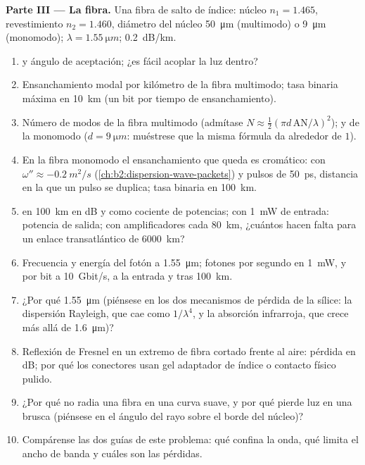\begin{problem}
\medskip
\noindent\textbf{Parte III --- La fibra.}
Una fibra de salto de índice: núcleo $n_1 = 1.465$, revestimiento $n_2 = 1.460$, diámetro
del núcleo \qty{50}{\micro m} (multimodo) o \qty{9}{\micro m} (monomodo);
$\lambda = \qty{1.55}{\micro m}$;  \qty{0.2}{dB/km}.
\begin{enumerate}[resume]
  \item {} y ángulo de aceptación; ¿es fácil acoplar
        la luz dentro?
  \item Ensanchamiento modal por kilómetro de la fibra multimodo; tasa binaria
        máxima en \qty{10}{km} (un bit por tiempo de ensanchamiento).
  \item Número de modos de la fibra multimodo (admítase $N \approx
        \tfrac12(\pi d\,\mathrm{AN}/\lambda)^2$); y de la monomodo ($d =
        \qty{9}{\micro m}$: muéstrese que la misma fórmula da alrededor de $1$).
  \item En la fibra monomodo el ensanchamiento que queda es cromático:
        con $\omega'' \approx \qty{-0.2}{m^2/s}$ (\cref{ch:b2:dispersion-wave-packets})
        y pulsos de \qty{50}{ps}, distancia en la que un pulso se duplica;
        tasa binaria en \qty{100}{km}.
  \item {} en \qty{100}{km} en dB y como cociente de potencias; con
        \qty{1}{mW} de entrada: potencia de salida; con amplificadores cada \qty{80}{km}, ¿cuántos
        hacen falta para un enlace transatlántico de \qty{6000}{km}?
  \item Frecuencia y energía del fotón a \qty{1.55}{\micro m}; fotones por
        segundo en \qty{1}{mW}, y por bit a \qty{10}{Gbit/s}, a la entrada
        y tras \qty{100}{km}.
  \item ¿Por qué \qty{1.55}{\micro m} (piénsese en los dos mecanismos de pérdida de
        la sílice: la dispersión Rayleigh, que cae como $1/\lambda^4$, y la absorción
        infrarroja, que crece más allá de \qty{1.6}{\micro m})?
  \item Reflexión de Fresnel en un extremo de fibra cortado frente al aire: pérdida en
        dB; por qué los conectores usan gel adaptador de índice o contacto
        físico pulido.
  \item ¿Por qué no radia una fibra en una curva suave, y por qué
        pierde luz en una brusca (piénsese en el ángulo del rayo
        sobre el borde del núcleo)?
  \item Compárense las dos guías de este problema: qué confina la
        onda, qué limita el ancho de banda y cuáles son las pérdidas.
\end{enumerate}
\end{problem}
